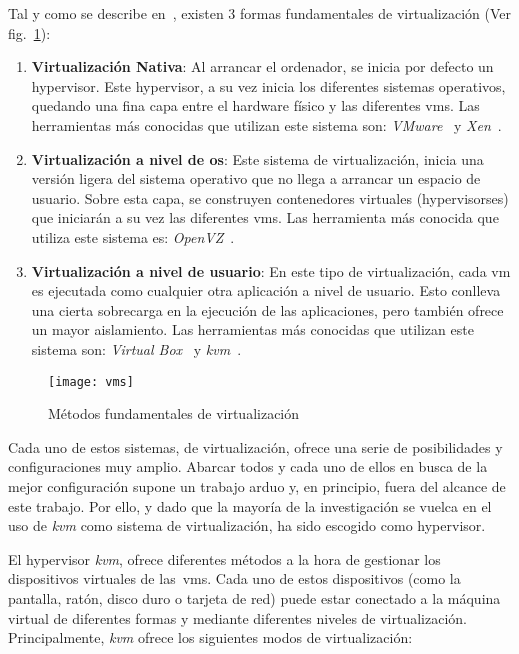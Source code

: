 Tal y como se describe en~\cite{schlosser2011performance}, existen 3 formas fundamentales de virtualización (Ver fig.~\ref{fig:ea:vm}):

\begin{enumerate}
\item \textbf{Virtualización Nativa}: Al arrancar el ordenador, se inicia por defecto un \gls{hypervisor}. Este \gls{hypervisor}, a su vez inicia los diferentes sistemas operativos, quedando una fina capa entre el hardware físico y las diferentes \glspl{vm}. Las herramientas más conocidas que utilizan este sistema son: \textit{VMware}~\cite{bib:vmware} y \textit{Xen}~\cite{bib:xen}.
\item \textbf{Virtualización a nivel de \gls{os}}: Este sistema de virtualización, inicia una versión ligera del sistema operativo que no llega a arrancar un espacio de usuario. Sobre esta capa, se construyen contenedores virtuales (\glspl{hypervisor}es) que iniciarán a su vez las diferentes \glspl{vm}. Las herramienta más conocida que utiliza este sistema es: \textit{OpenVZ}~\cite{bib:openvz}.
\item \textbf{Virtualización a nivel de usuario}: En este tipo de virtualización, cada \gls{vm} es ejecutada como cualquier otra aplicación a nivel de usuario. Esto conlleva una cierta sobrecarga en la ejecución de las aplicaciones, pero también ofrece un mayor aislamiento. Las herramientas más conocidas que utilizan este sistema son: \textit{Virtual Box}~\cite{bib:virtualbox} y \textit{\gls{kvm}}~\cite{bib:kvm}.
\end{enumerate}

\begin{figure}[!bth]
\centering
\texttt{[image: vms]}
\caption{Métodos fundamentales de virtualización}
\label{fig:ea:vm}
\end{figure}

Cada uno de estos sistemas, de virtualización, ofrece una serie de posibilidades y configuraciones muy amplio. Abarcar todos y cada uno de ellos en busca de la mejor configuración supone un trabajo arduo y, en principio, fuera del alcance de este trabajo. Por ello, y dado que la mayoría de la investigación se vuelca en el uso de \textit{\gls{kvm}} como sistema de virtualización, ha sido escogido como \gls{hypervisor}.

El \gls{hypervisor} \textit{\gls{kvm}}, ofrece diferentes métodos a la hora de gestionar los dispositivos virtuales de las~\glspl{vm}. Cada uno de estos dispositivos (como la pantalla, ratón, disco duro o tarjeta de red) puede estar conectado a la máquina virtual de diferentes formas y mediante diferentes niveles de virtualización. Principalmente, \textit{\gls{kvm}} ofrece los siguientes modos de virtualización:

